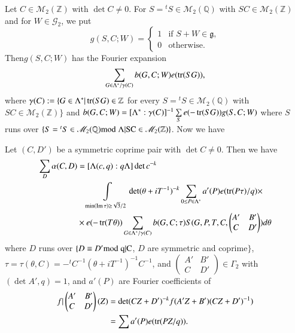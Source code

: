 Let $C\in\mathscr{M}_{2}(\mathbb{Z})$ with $\det C\neq 0$. For
$S={}^{t}S\in\mathscr{M}_{2}(\mathbb{Q})$ with
$SC\in\mathscr{M}_{2}(\mathbb{Z})$ and for $W\in\mathscr{G}_{2}$, we
put
$$
g(S,C;W)=
\begin{cases}
1 & \text{if \ } S+W\in\mathfrak{g},\\
0 & \text{otherwise.}
\end{cases}
$$
Then\pageoriginale $g(S,C;W)$ has the Fourier expansion
$$
\sum_{G\in\Lambda^{\ast}/\gamma(C)}b(G,C;W)e(\operatorname{tr}(SG)),
$$
where $\gamma(C):=\{G\in\Lambda^{\ast}|\operatorname{tr}(SG)\in\mathbb{Z}$ for every
$S={}^{t}S\in\mathscr{M}_{2}(\mathbb{Q})$ with
$SC\in\mathscr{M}_{2}(\mathbb{Z})\}$ and
$b(G,C;W)=[\Lambda^{\ast}:\gamma(C)]^{-1}\sum\limits_{S}e(-\operatorname{tr}(SG))g(S,C;W)$
where $S$ runs over $\{S={}^{t}S\in\mathscr{M}_{2}(\mathbb{Q})\rm{mod} \;
\Lambda|SC\in\mathscr{M}_{2}(\mathbb{Z})\}$. Now we have

\setcounter{sublemma}{7}
\begin{sublemma}\label{c1:lem-1.5.8}
Let $(C,D')$ be a symmetric coprime pair with $\det C\neq 0$. Then we
have
\begin{align*}
\sum_{D}\alpha(C,D)
&=[\Lambda(c,q):q\Lambda]\det c^{-k}\\
&\quad\int\limits_{\min(\operatorname{Im} \tau)\geq
  \sqrt{3}/2}\det(\theta+iT^{-1})^{-k}\sum_{0\leq
  P\in\Lambda^{\ast}}a'(P)e(\operatorname{tr}(P\tau)/q)\times\\
&\times
e(-\operatorname{tr}(T\theta))\sum_{G\in\Lambda^{\ast}/\gamma(C)}b(G,C;\tau)S(G,P,T,C,
\begin{pmatrix}
A' & B'\\
C & D'
\end{pmatrix}
)d\theta
\end{align*}
where $D$ runs over $\{D\equiv D'\rm{mod} \; q|C$, $D$ are symmetric and
coprime$\}$,
$\tau=\tau(\theta,C)=-{}^{t}C^{-1}(\theta+iT^{-1})^{-1}C^{-1}$, and
$\left(\begin{smallmatrix} A' & B'\\ C & D'
\end{smallmatrix}\right)\in\Gamma_{2}$ with $(\det A',q)=1$, and
$a'(P)$ are Fourier coefficients of 
\begin{align*}
f|\begin{pmatrix}
A' & B'\\
C & D'
\end{pmatrix}
(Z)&=\det(CZ+D')^{-k}f(A'Z+B')(CZ+D')^{-1})\\
&=\sum a'(P)e(\operatorname{tr} (PZ/q)).
\end{align*}
\end{sublemma}

